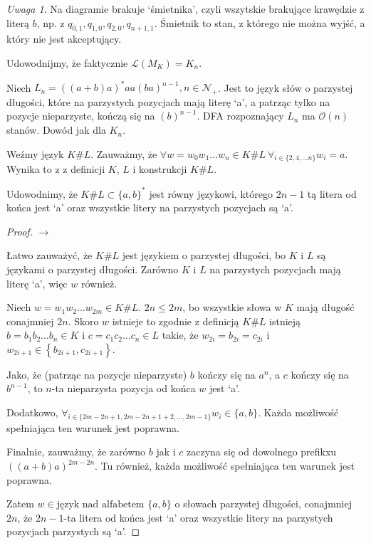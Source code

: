 \documentclass{article}
\theoremstyle{definition}
\theoremstyle{remark}
\newtheorem*{remark}{Uwaga}
\begin{document}
\begin{remark}
    Na diagramie brakuje `śmietnika', czyli wszytskie brakujące krawędzie z literą \(b\), np. z \(q_{0,1},q_{1,0},q_{2,0}, q_{n+1,1}\).
    Śmietnik to stan, z którego nie można wyjść, a który nie jest akceptujący.
\end{remark}

Udowodnijmy, że faktycznie \(\mathcal{L}(M_K) = K_n\).



Niech \(L_n = ( (a+b)a )^* aa (ba)^{n-1}, n \in \mathcal{N_+}\). Jest to język
słów o parzystej długości, które na parzystych pozycjach mają literę `a', a
patrząc tylko na pozycje nieparzyste, kończą się na \( (b)^{n-1}\). DFA rozpoznający \(L_n\)
ma \(\mathcal{O}(n)\) stanów. Dowód jak dla \(K_n\).

Weźmy język \(K \# L\). Zauważmy, że \( \forall w= w_0 w_1 \ldots w_n \in K \#
L \ \forall_{i \in \{ 2, 4, \ldots n \} } w_i = a\). Wynika to z z definicji
\(K\), \(L\) i konstrukcji \(K \# L\).

Udowodnimy, że \(K \# L \subset \{ a, b \}^*\) jest równy językowi, którego
\(2n-1\) tą litera od końca jest `a' oraz wszystkie litery na parzystych
pozycjach są `a'.

\begin{proof}

    \(\rightarrow\)

    Łatwo zauważyć, że \(K \# L\) jest językiem o parzystej długości, bo \(K\) i \(L\) są językami o parzystej długości.
    Zarówno \(K\) i \(L\) na parzystych pozycjach mają literę `a', więc \(w\) również.

    Niech \(w = w_1 w_2 \ldots w_{2m} \in K \# L\). \(2n \leq 2m\), bo wszystkie
    słowa w \(K\) mają długość conajmniej \(2n\). Skoro \(w\) istnieje to zgodnie z
    definicją \(K \# L\) istnieją \(b=b_1 b_2 \ldots b_n \in K\) i \(c=c_1 c_2
    \ldots c_n \in L\) takie, że \(w_{2i} = b_{2i} = c_{2i}\) i \(w_{2i+1} \in
    \left\{ b_{2i+1}, c_{2i+1} \right\}\).

    Jako, że (patrząc na pozycje nieparzyste) \(b\) kończy się na \(a^n\), a \(c\)
    kończy się na \(b^{n-1}\), to \(n\)-ta nieparzysta pozycja od końca \(w\) jest
    `a'.

    Dodatkowo, \( \forall_{i \in \{2m - 2n + 1, 2m - 2n + 1 + 2, \ldots, 2m - 1 \}}
    w_i \in \{ a,b \}\). Każda możliwość spełniająca ten warunek jest poprawna.

    Finalnie, zauważmy, że zarówno \(b\) jak i \(c\) zaczyna się od dowolnego
    prefikxu \( ((a+b)a)^{2m-2n} \). Tu również, każda możliwość spełniająca ten
    warunek jest poprawna.

    Zatem \(w \in \text{język nad alfabetem } \{ a, b \}\) o słowach parzystej
    długości, conajmniej \(2n\), że \(2n-1\)-ta litera od końca jest `a' oraz
    wszystkie litery na parzystych pozycjach parzystych są `a'.

\end{proof}
\end{document}

